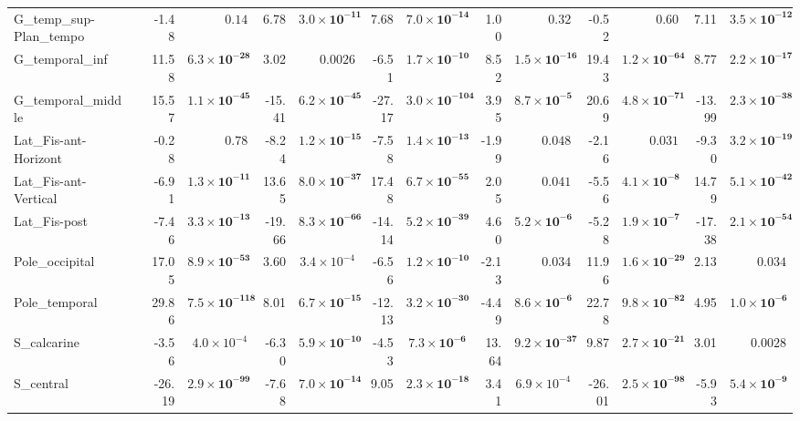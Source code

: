 {\begin{longtable}{llrrrrrrrrrrrr}
G\_temp\_sup-Plan\_tempo &  & -1.48 & $0.14$ & 6.78 & $\mathbf{3.0{\times}10^{-11}}$ & 7.68 & $\mathbf{7.0{\times}10^{-14}}$ & 1.00 & $0.32$ & -0.52 & $0.60$ & 7.11 & $\mathbf{3.5{\times}10^{-12}}$ \\
G\_temporal\_inf &  & 11.58 & $\mathbf{6.3{\times}10^{-28}}$ & 3.02 & $0.0026$ & -6.51 & $\mathbf{1.7{\times}10^{-10}}$ & 8.52 & $\mathbf{1.5{\times}10^{-16}}$ & 19.43 & $\mathbf{1.2{\times}10^{-64}}$ & 8.77 & $\mathbf{2.2{\times}10^{-17}}$ \\
G\_temporal\_middle &  & 15.57 & $\mathbf{1.1{\times}10^{-45}}$ & -15.41 & $\mathbf{6.2{\times}10^{-45}}$ & -27.17 & $\mathbf{3.0{\times}10^{-104}}$ & 3.95 & $\mathbf{8.7{\times}10^{-5}}$ & 20.69 & $\mathbf{4.8{\times}10^{-71}}$ & -13.99 & $\mathbf{2.3{\times}10^{-38}}$ \\
Lat\_Fis-ant-Horizont &  & -0.28 & $0.78$ & -8.24 & $\mathbf{1.2{\times}10^{-15}}$ & -7.58 & $\mathbf{1.4{\times}10^{-13}}$ & -1.99 & $0.048$ & -2.16 & $0.031$ & -9.30 & $\mathbf{3.2{\times}10^{-19}}$ \\
Lat\_Fis-ant-Vertical &  & -6.91 & $\mathbf{1.3{\times}10^{-11}}$ & 13.65 & $\mathbf{8.0{\times}10^{-37}}$ & 17.48 & $\mathbf{6.7{\times}10^{-55}}$ & 2.05 & $0.041$ & -5.56 & $\mathbf{4.1{\times}10^{-8}}$ & 14.79 & $\mathbf{5.1{\times}10^{-42}}$ \\
Lat\_Fis-post &  & -7.46 & $\mathbf{3.3{\times}10^{-13}}$ & -19.66 & $\mathbf{8.3{\times}10^{-66}}$ & -14.14 & $\mathbf{5.2{\times}10^{-39}}$ & 4.60 & $\mathbf{5.2{\times}10^{-6}}$ & -5.28 & $\mathbf{1.9{\times}10^{-7}}$ & -17.38 & $\mathbf{2.1{\times}10^{-54}}$ \\
Pole\_occipital &  & 17.05 & $\mathbf{8.9{\times}10^{-53}}$ & 3.60 & $3.4{\times}10^{-4}$ & -6.56 & $\mathbf{1.2{\times}10^{-10}}$ & -2.13 & $0.034$ & 11.96 & $\mathbf{1.6{\times}10^{-29}}$ & 2.13 & $0.034$ \\
Pole\_temporal &  & 29.86 & $\mathbf{7.5{\times}10^{-118}}$ & 8.01 & $\mathbf{6.7{\times}10^{-15}}$ & -12.13 & $\mathbf{3.2{\times}10^{-30}}$ & -4.49 & $\mathbf{8.6{\times}10^{-6}}$ & 22.78 & $\mathbf{9.8{\times}10^{-82}}$ & 4.95 & $\mathbf{1.0{\times}10^{-6}}$ \\
S\_calcarine &  & -3.56 & $4.0{\times}10^{-4}$ & -6.30 & $\mathbf{5.9{\times}10^{-10}}$ & -4.53 & $\mathbf{7.3{\times}10^{-6}}$ & 13.64 & $\mathbf{9.2{\times}10^{-37}}$ & 9.87 & $\mathbf{2.7{\times}10^{-21}}$ & 3.01 & $0.0028$ \\
S\_central &  & -26.19 & $\mathbf{2.9{\times}10^{-99}}$ & -7.68 & $\mathbf{7.0{\times}10^{-14}}$ & 9.05 & $\mathbf{2.3{\times}10^{-18}}$ & 3.41 & $6.9{\times}10^{-4}$ & -26.01 & $\mathbf{2.5{\times}10^{-98}}$ & -5.93 & $\mathbf{5.4{\times}10^{-9}}$ \\

\end{longtable}}
